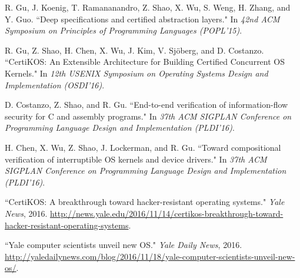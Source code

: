 \documentclass[a4paper, 10pt]{article}
\begin{document}

\begin{footnotesize}
\begin{thebibliography}{}




R. Gu, J. Koenig, T. Ramananandro, Z. Shao, X. Wu, S. Weng, H. Zhang, and Y. Guo. ``Deep specifications and certified abstraction layers." In
\emph{42nd ACM Symposium on Principles of Programming
Languages (POPL'15)}.

R. Gu, Z. Shao, H. Chen, X. Wu, J. Kim, V. Sj\"{o}berg, and D. Costanzo. ``CertiKOS: An Extensible Architecture for Building Certified Concurrent OS Kernels." In \emph{12th USENIX Symposium on Operating Systems Design and Implementation (OSDI'16)}. 

D. Costanzo,  Z. Shao, and R. Gu. ``End-to-end verification of information-flow security for C and assembly programs." In 
\emph{37th ACM SIGPLAN Conference on Programming Language Design and Implementation (PLDI'16)}.

H. Chen,  X. Wu, Z. Shao, J. Lockerman, and R. Gu. ``Toward compositional verification of interruptible OS kernels and device drivers." In \emph{37th ACM SIGPLAN Conference on Programming Language Design and Implementation (PLDI'16)}.



``CertiKOS: A breakthrough toward hacker-resistant operating systems." \emph{Yale News}, 2016.
\url{http://news.yale.edu/2016/11/14/certikos-breakthrough-toward-hacker-resistant-operating-systems}.

``Yale computer scientists unveil new OS." \emph{Yale Daily News}, 2016.
\url{http://yaledailynews.com/blog/2016/11/18/yale-computer-scientists-unveil-new-os/}.



\end{thebibliography}
\end{footnotesize}
\end{document}
